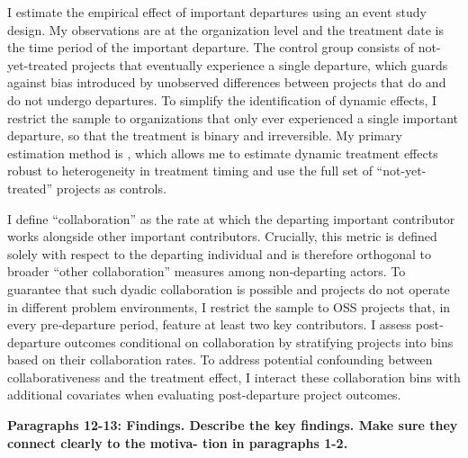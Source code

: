 \documentclass[12pt,notitlepage]{article}
\begin{document}
I estimate the empirical effect of important departures using an event study design. My observations are at the organization level and the treatment date is the time period of the important departure. The control group consists of not-yet-treated projects that eventually experience a single departure, which guards against bias introduced by unobserved differences between projects that do and do not undergo departures. To simplify the identification of dynamic effects, I restrict the sample to organizations that only ever experienced a single important departure, so that the treatment is binary and irreversible. My primary estimation method is \cite{callaway_difference--differences_2021}, which allows me to estimate dynamic treatment effects robust to heterogeneity in treatment timing and use the full set of ``not-yet-treated'' projects as controls. 

I define ``collaboration” as the rate at which the departing important contributor works alongside other important contributors. Crucially, this metric is defined solely with respect to the departing individual and is therefore orthogonal to broader “other collaboration” measures among non‐departing actors. To guarantee that such dyadic collaboration is possible and projects do not operate in different problem environments, I restrict the sample to OSS projects that, in every pre‐departure period, feature at least two key contributors. I assess post‐departure outcomes conditional on collaboration by stratifying projects into bins based on their collaboration rates.  To address potential confounding between collaborativeness and the treatment effect, I interact these collaboration bins with additional covariates when evaluating post-departure project outcomes.


\textbf{Paragraphs 12-13: Findings. Describe the key findings. Make sure they connect clearly to the motiva-
tion in paragraphs 1-2.}
\end{document}
